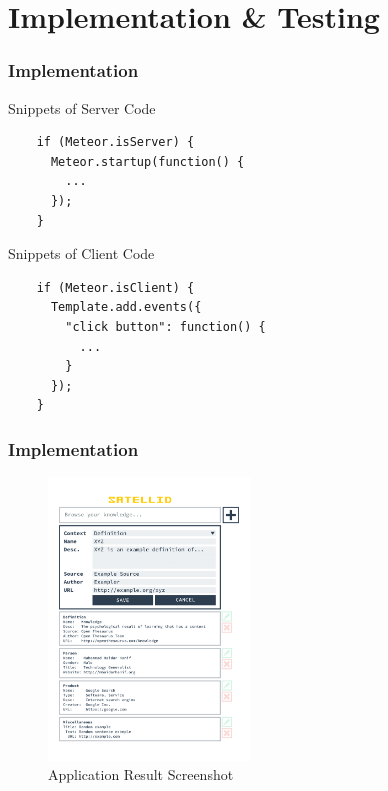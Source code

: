 \documentclass[10pt, compress]{beamer}
\begin{document}

\section{Implementation \& Testing}


\begin{frame}[fragile]
  \frametitle{Implementation}

  Snippets of Server Code
  \begin{verbatim}
    if (Meteor.isServer) {
      Meteor.startup(function() {
        ...
      });
    }
  \end{verbatim}

  Snippets of Client Code
  \begin{verbatim}
    if (Meteor.isClient) {
      Template.add.events({
        "click button": function() {
          ...
        }
      });
    }
  \end{verbatim}

\end{frame}


\begin{frame}[fragile]
  \frametitle{Implementation}

  \begin{figure}[ht]
    \centering
    \vspace{-25pt}
    \includegraphics[height=7.5cm]{include/satellid-app-result.png}
    \vspace{-10pt}
    \caption{Application Result Screenshot}
    \label{fig:satellid-app-result}
  \end{figure}

\end{frame}
\end{document}
